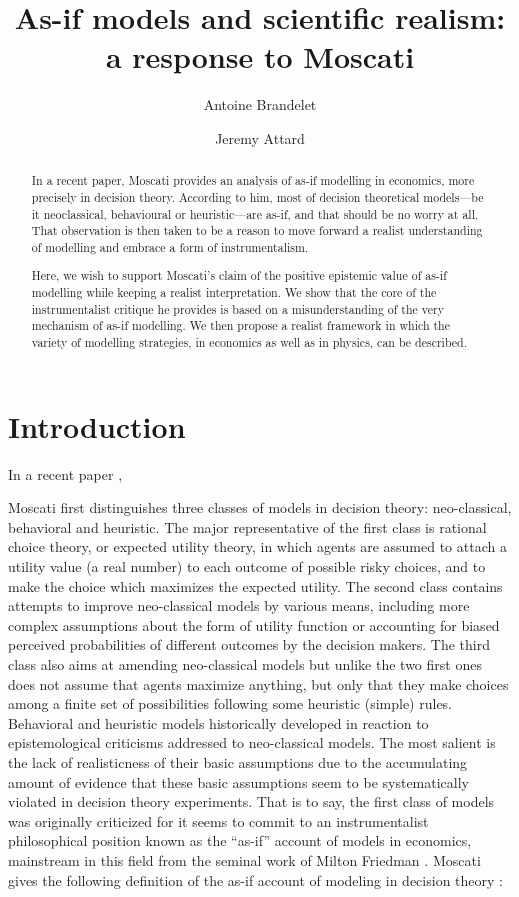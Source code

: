\documentclass[a4paper,11pt]{article}
\title{As-if models and scientific realism: a response to Moscati}
\date{}
\author[1]{Antoine Brandelet}
\author[1,2]{Jeremy Attard}
\affil[1]{Department of Philosophy and History of Science, University of Mons, Belgium}
\affil[2]{Department of Sciences, Philosophies and Societies, University of Namur, Belgium}
\theoremstyle{definition}
\begin{document}
\maketitle

\begin{abstract}
    In a recent paper, Moscati provides an analysis of as-if modelling in economics, more precisely in decision theory. According to him, most of decision theoretical models---be it neoclassical, behavioural or heuristic---are as-if, and that should be no worry at all. That observation is then taken to be a reason to move forward a realist understanding of modelling and embrace a form of instrumentalism.

    Here, we wish to support Moscati's claim of the positive epistemic value of as-if modelling while keeping a realist interpretation. We show that the core of the instrumentalist critique he provides is based on a misunderstanding of the very mechanism of as-if modelling. We then propose a realist framework in which the variety of modelling strategies, in economics as well as in physics, can be described.
\end{abstract}


\section{Introduction}

In a recent paper \citep{Moscati2023}, 

Moscati first distinguishes three classes of models in decision theory: neo-classical, behavioral and heuristic. The major representative of the first class is rational choice theory, or expected utility theory, in which agents are assumed to attach a utility value (a real number) to each outcome of possible risky choices, and to make the choice which maximizes the expected utility. The second class contains attempts to improve neo-classical models by various means, including more complex assumptions about the form of utility function or accounting for biased perceived probabilities of different outcomes by the decision makers. The third class also aims at amending neo-classical models but unlike the two first ones does not assume that agents maximize anything, but only that they make choices among a finite set of possibilities following some heuristic (simple) rules. Behavioral and heuristic models historically developed in reaction to epistemological criticisms addressed to neo-classical models. The most salient is the lack of realisticness of their basic assumptions due to the accumulating amount of evidence that these basic assumptions seem to be systematically violated in decision theory experiments. That is to say, the first class of models was originally criticized for it seems to commit to an instrumentalist philosophical position known as the ``as-if'' account of models in economics, mainstream in this field from the seminal work of Milton Friedman \cite{Friedman1953}. Moscati gives the following definition of the as-if account of modeling in decision theory \citep[p. 2]{Moscati2023}: 
\end{document}
